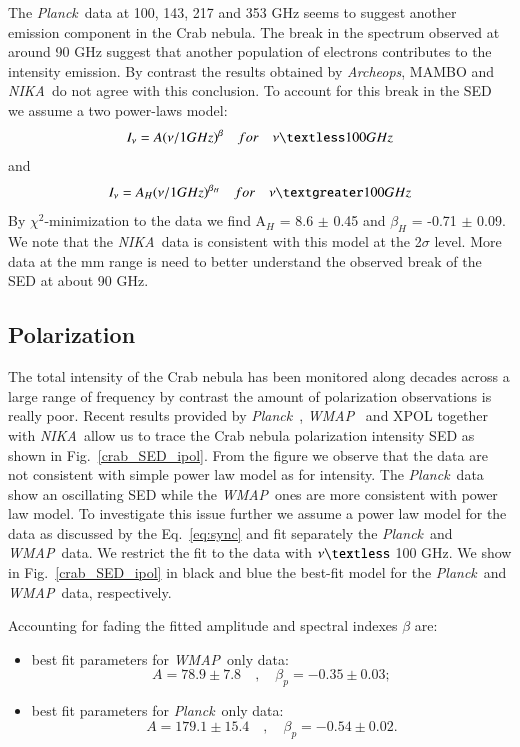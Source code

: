 \documentclass[twocolumn,traditabstract]{aa}
\def\NIKA{\textit{NIKA}}
\def\Planck{\textit{Planck}}
\def\WMAP{\textit{WMAP}}
\begin{document}
The \Planck\ data at 100, 143, 217 and 353 GHz seems to suggest another emission component in the Crab nebula. The break in the spectrum observed at around 90 GHz   suggest that another population of electrons contributes to the intensity emission. By contrast  the results obtained by {\it Archeops}, MAMBO and \NIKA\ do not agree with this conclusion. 
To account for this break in the SED we assume a two power-laws model:
\begin{equation}
I_{\nu} = A(\nu/1GHz)^{\beta} \quad for \quad \nu   \textless  100 GHz
\end{equation}
and 
\begin{equation}
I_{\nu} = A_{H}(\nu/1GHz)^{\beta_H} \quad for \quad \nu   \textgreater  100 GHz
\end{equation}
By $\chi^2$-minimization to the data we find
A$_H$ = 8.6 $\pm$ 0.45 and $\beta_H$ = -0.71 $\pm$ 0.09.
We note that the \NIKA\ data is consistent with this model at the 2$\sigma$ level. More data at the mm range is need to better understand the observed break of the SED at about 90 GHz. 


\subsection{Polarization}
The total intensity of the Crab nebula has been monitored along decades across a large range of frequency by contrast the amount of polarization observations is really poor.
Recent results provided by \Planck\ \citep{2015arXiv150702058P}, \WMAP\ \citep{2011ApJS..192...19W} and XPOL \citep{aumont2010} together with \NIKA\ allow us to trace the Crab nebula polarization intensity SED as shown in Fig.~\ref{crab_SED_ipol}. 
From the figure we observe that the data are not consistent with simple power law model as for intensity. 
The \Planck\ data show an oscillating SED while the \WMAP\ ones are more consistent with power law model.
To investigate this issue further we assume a power law model for the data as discussed by the Eq.~\ref{eq:sync} and fit separately the \Planck\ and \WMAP\ data.
We restrict the fit to the data with $\nu \textless$ 100 GHz. We show in Fig.~\ref{crab_SED_ipol} in black and blue the best-fit model for the \Planck\ and \WMAP\ data, respectively.

Accounting for fading the fitted amplitude and spectral indexes $\beta$ are:
\begin{itemize}
\item best fit parameters for \WMAP\ only data:
\begin{equation}
A = 78.9\pm7.8 \quad , \quad \beta_p = -0.35\pm0.03;
\end{equation}
\item best fit parameters for \Planck\ only data:
\begin{equation}
A = 179.1\pm15.4 \quad , \quad \beta_p = -0.54\pm0.02.
\end{equation}
\end{itemize}
\end{document}
